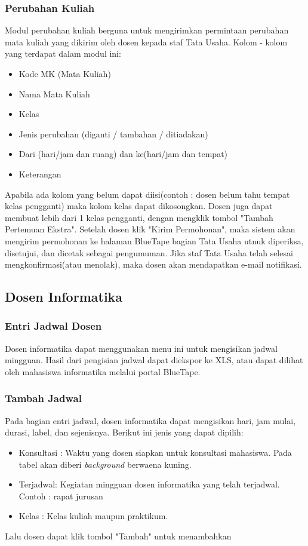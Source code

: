 \subsubsection{Perubahan Kuliah}
Modul perubahan kuliah berguna untuk mengirimkan permintaan perubahan mata kuliah yang dikirim oleh dosen kepada staf Tata Usaha. Kolom - kolom yang terdapat dalam modul ini:
\begin{itemize}
\item Kode MK (Mata Kuliah)
\item Nama Mata Kuliah
\item Kelas
\item Jenis perubahan (diganti / tambahan / ditiadakan)
\item Dari (hari/jam dan ruang) dan ke(hari/jam dan tempat)
\item Keterangan
\end{itemize}
Apabila ada kolom yang belum dapat diisi(contoh : dosen belum tahu tempat kelas pengganti) maka kolom kelas dapat dikosongkan.
Dosen juga dapat membuat lebih dari 1 kelas pengganti, dengan mengklik tombol "Tambah Pertemuan Ekstra".
Setelah dosen klik "Kirim Permohonan", maka sistem akan mengirim permohonan ke halaman BlueTape bagian Tata Usaha utnuk diperiksa, disetujui, dan dicetak sebagai pengumuman. Jika staf Tata Usaha telah selesai mengkonfirmasi(atau menolak), maka dosen akan mendapatkan e-mail notifikasi.

\subsection{Dosen Informatika}
\subsubsection{Entri Jadwal Dosen}
Dosen informatika dapat menggunakan menu ini untuk mengisikan jadwal mingguan. Hasil dari pengisian jadwal dapat diekspor ke XLS, atau dapat dilihat oleh mahasiswa informatika melalui portal BlueTape.
\subsubsection{Tambah Jadwal}
Pada bagian entri jadwal, dosen informatika dapat mengisikan hari, jam mulai, durasi, label, dan sejenisnya. Berikut ini jenis yang dapat dipilih:
\begin{itemize}
\item Konsultasi : Waktu yang dosen siapkan untuk konsultasi mahasiswa. Pada tabel akan diberi \textit{background} berwaena kuning.
\item Terjadwal: Kegiatan mingguan dosen informatika yang telah terjadwal. Contoh : rapat jurusan
\item Kelas : Kelas kuliah maupun praktikum.
\end{itemize}
Lalu dosen dapat klik tombol "Tambah" untuk menambahkan

